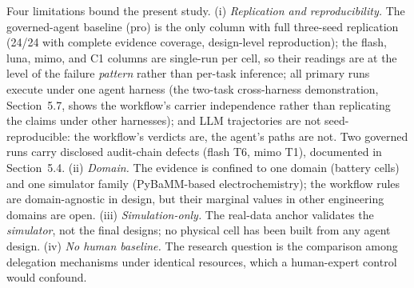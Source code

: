 Four limitations bound the present study. (i) \emph{Replication and
reproducibility.} The governed-agent baseline (pro) is the only column with
full three-seed replication (24/24 with complete evidence coverage,
design-level reproduction); the flash, luna, mimo, and C1 columns are
single-run per cell, so their readings are at the level of the failure
\emph{pattern} rather than per-task inference; all primary runs execute
under one agent harness (the two-task cross-harness demonstration,
Section~5.7, shows the workflow's carrier independence rather than
replicating the claims under other harnesses); and LLM trajectories are not
seed-reproducible: the workflow's verdicts are, the agent's paths are not.
Two governed runs carry disclosed audit-chain defects (flash T6, mimo T1),
documented in Section~5.4. (ii) \emph{Domain.} The evidence is confined to
one domain (battery cells) and one simulator family (PyBaMM-based
electrochemistry); the workflow rules are domain-agnostic in design,
but their marginal values in other engineering domains are open. (iii)
\emph{Simulation-only.} The real-data anchor validates the
\emph{simulator}, not the final designs; no physical cell has been built
from any agent design. (iv) \emph{No human baseline.} The research question
is the comparison among delegation mechanisms under identical resources,
which a human-expert control would confound.
